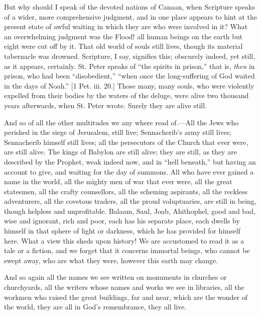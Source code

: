 But why should I speak of the devoted nations of Canaan, when
Scripture speaks of a wider, more comprehensive judgment, and in one
place appears to hint at the present state of awful waiting in which
they are who were involved in it? What an overwhelming judgment was
the Flood! all human beings on the earth but eight were cut off by it.
That old world of souls still lives, though its material tabernacle
was drowned. Scripture, I say, signifies this; obscurely indeed, yet
still, as it appears, certainly. St. Peter speaks of ``the spirits
in prison,'' that is, \emph{then} in prison, who had been
``disobedient,'' ``when once the long-suffering of God
waited in the days of Noah.'' [1 Pet. iii. 20.] Those many, many
souls, who were violently expelled from their bodies by the waters of
the deluge, were alive two thousand years afterwards, when St. Peter
wrote. Surely they are alive still.

And so of all the other multitudes we any where read of.—All the
Jews who perished in the siege of Jerusalem, still live; Sennacherib's
army still lives; Sennacherib himself still lives; all the persecutors
of the Church that ever were, are still alive. The kings of Babylon
are still alive; they are still, as they are described by the Prophet,
weak indeed now, and in ``hell beneath,'' but having an
account to give, and waiting for the day of summons. All who have ever
gained a name in the world, all the mighty men of war that ever were,
all the great statesmen, all the crafty counsellors, all the scheming
aspirants, all the reckless adventurers, all the covetous traders, all
the proud voluptuaries, are still in being, though helpless and
unprofitable. Balaam, Saul, Joab, Ahithophel, good and bad, wise and
ignorant, rich and poor, each has his separate place, each dwells by
himself in that sphere of light or darkness, which he has provided for
himself here. What a view this sheds upon history! We are accustomed
to read it as a tale or a fiction, and we forget that it concerns
immortal beings, who cannot be swept away, who are what they were,
however this earth may change.

And so again all the names we see written on monuments in churches
or churchyards, all the writers whose names and works we see in
libraries, all the workmen who raised the great buildings, far and
near, which are the wonder of the world, they are all in God's
remembrance, they all live.

